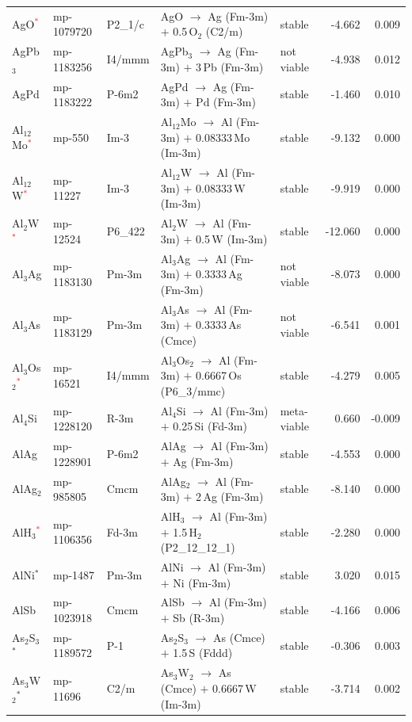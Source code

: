\begin{longtable}{@{}ll l@{\hspace{4pt}} p{4.6cm} l@{\hspace{4pt}} rr@{}}
AgO\textcolor{red}{$^*$} & mp-1079720 & P2\_1/c & AgO $\to$ Ag (Fm-3m) $+$ 0.5\,O$_{2}$ (C2/m) & stable & -4.662 & 0.009 \\
AgPb$_{3}$ & mp-1183256 & I4/mmm & AgPb$_{3}$ $\to$ Ag (Fm-3m) $+$ 3\,Pb (Fm-3m) & not viable & -4.938 & 0.012 \\
AgPd & mp-1183222 & P-6m2 & AgPd $\to$ Ag (Fm-3m) $+$ Pd (Fm-3m) & stable & -1.460 & 0.010 \\
Al$_{12}$Mo\textcolor{red}{$^*$} & mp-550 & Im-3 & Al$_{12}$Mo $\to$ Al (Fm-3m) $+$ 0.08333\,Mo (Im-3m) & stable & -9.132 & 0.000 \\
Al$_{12}$W\textcolor{red}{$^*$} & mp-11227 & Im-3 & Al$_{12}$W $\to$ Al (Fm-3m) $+$ 0.08333\,W (Im-3m) & stable & -9.919 & 0.000 \\
Al$_{2}$W\textcolor{red}{$^*$} & mp-12524 & P6\_422 & Al$_{2}$W $\to$ Al (Fm-3m) $+$ 0.5\,W (Im-3m) & stable & -12.060 & 0.000 \\
Al$_{3}$Ag & mp-1183130 & Pm-3m & Al$_{3}$Ag $\to$ Al (Fm-3m) $+$ 0.3333\,Ag (Fm-3m) & not viable & -8.073 & 0.000 \\
Al$_{3}$As & mp-1183129 & Pm-3m & Al$_{3}$As $\to$ Al (Fm-3m) $+$ 0.3333\,As (Cmce) & not viable & -6.541 & 0.001 \\
Al$_{3}$Os$_{2}$\textcolor{red}{$^*$} & mp-16521 & I4/mmm & Al$_{3}$Os$_{2}$ $\to$ Al (Fm-3m) $+$ 0.6667\,Os (P6\_3/mmc) & stable & -4.279 & 0.005 \\
Al$_{4}$Si & mp-1228120 & R-3m & Al$_{4}$Si $\to$ Al (Fm-3m) $+$ 0.25\,Si (Fd-3m) & meta-viable & 0.660 & -0.009 \\
AlAg & mp-1228901 & P-6m2 & AlAg $\to$ Al (Fm-3m) $+$ Ag (Fm-3m) & stable & -4.553 & 0.000 \\
AlAg$_{2}$ & mp-985805 & Cmcm & AlAg$_{2}$ $\to$ Al (Fm-3m) $+$ 2\,Ag (Fm-3m) & stable & -8.140 & 0.000 \\
AlH$_{3}$\textcolor{red}{$^*$} & mp-1106356 & Fd-3m & AlH$_{3}$ $\to$ Al (Fm-3m) $+$ 1.5\,H$_{2}$ (P2\_12\_12\_1) & stable & -2.280 & 0.000 \\
AlNi$^*$ & mp-1487 & Pm-3m & AlNi $\to$ Al (Fm-3m) $+$ Ni (Fm-3m) & stable & 3.020 & 0.015 \\
AlSb & mp-1023918 & Cmcm & AlSb $\to$ Al (Fm-3m) $+$ Sb (R-3m) & stable & -4.166 & 0.006 \\
As$_{2}$S$_{3}$$^*$ & mp-1189572 & P-1 & As$_{2}$S$_{3}$ $\to$ As (Cmce) $+$ 1.5\,S (Fddd) & stable & -0.306 & 0.003 \\
As$_{3}$W$_{2}$$^*$ & mp-11696 & C2/m & As$_{3}$W$_{2}$ $\to$ As (Cmce) $+$ 0.6667\,W (Im-3m) & stable & -3.714 & 0.002 \\

\end{longtable}
